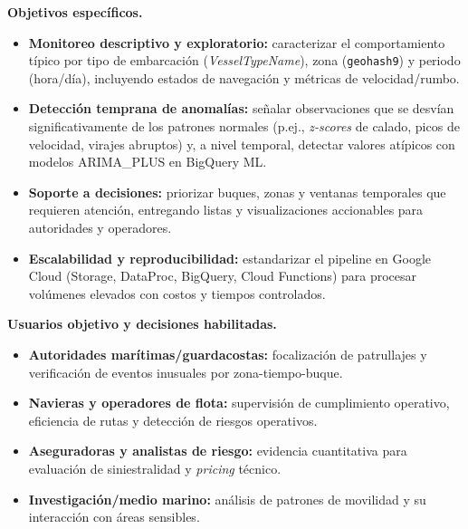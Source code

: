 \documentclass[10pt]{article}
\begin{document}
\vspace{0.2cm}
\noindent\textbf{Objetivos específicos.}
\begin{itemize}
  \item \textbf{Monitoreo descriptivo y exploratorio:} caracterizar el comportamiento típico por tipo de embarcación (\textit{VesselTypeName}), zona (\texttt{geohash9}) y periodo (hora/día), incluyendo estados de navegación y métricas de velocidad/rumbo.
  \item \textbf{Detección temprana de anomalías:} señalar observaciones que se desvían significativamente de los patrones normales (p.ej., \emph{z-scores} de calado, picos de velocidad, virajes abruptos) y, a nivel temporal, detectar valores atípicos con modelos ARIMA\_PLUS en BigQuery ML.
  \item \textbf{Soporte a decisiones:} priorizar buques, zonas y ventanas temporales que requieren atención, entregando listas y visualizaciones accionables para autoridades y operadores.
  \item \textbf{Escalabilidad y reproducibilidad:} estandarizar el pipeline en Google Cloud (Storage, DataProc, BigQuery, Cloud Functions) para procesar volúmenes elevados con costos y tiempos controlados.
\end{itemize}

\vspace{0.2cm}
\noindent\textbf{Usuarios objetivo y decisiones habilitadas.}
\begin{itemize}
  \item \textbf{Autoridades marítimas/guardacostas:} focalización de patrullajes y verificación de eventos inusuales por zona-tiempo-buque.
  \item \textbf{Navieras y operadores de flota:} supervisión de cumplimiento operativo, eficiencia de rutas y detección de riesgos operativos.
  \item \textbf{Aseguradoras y analistas de riesgo:} evidencia cuantitativa para evaluación de siniestralidad y \textit{pricing} técnico.
  \item \textbf{Investigación/medio marino:} análisis de patrones de movilidad y su interacción con áreas sensibles.
\end{itemize}
\end{document}
